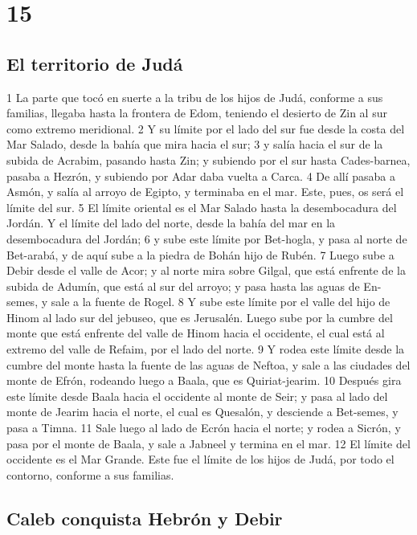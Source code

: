 \chapter{15}

\section*{El territorio de Judá}

1 La parte que tocó en suerte a la tribu de los hijos de Judá, conforme a sus familias, llegaba hasta la frontera de Edom, teniendo el desierto de Zin al sur como extremo meridional.
2 Y su límite por el lado del sur fue desde la costa del Mar Salado, desde la bahía que mira hacia el sur;
3 y salía hacia el sur de la subida de Acrabim, pasando hasta Zin; y subiendo por el sur hasta Cades-barnea, pasaba a Hezrón, y subiendo por Adar daba vuelta a Carca.
4 De allí pasaba a Asmón, y salía al arroyo de Egipto, y terminaba en el mar. Este, pues, os será el límite del sur.
5 El límite oriental es el Mar Salado hasta la desembocadura del Jordán. Y el límite del lado del norte, desde la bahía del mar en la desembocadura del Jordán;
6 y sube este límite por Bet-hogla, y pasa al norte de Bet-arabá, y de aquí sube a la piedra de Bohán hijo de Rubén.
7 Luego sube a Debir desde el valle de Acor; y al norte mira sobre Gilgal, que está enfrente de la subida de Adumín, que está al sur del arroyo; y pasa hasta las aguas de En-semes, y sale a la fuente de Rogel.
8 Y sube este límite por el valle del hijo de Hinom al lado sur del jebuseo, que es Jerusalén. Luego sube por la cumbre del monte que está enfrente del valle de Hinom hacia el occidente, el cual está al extremo del valle de Refaim, por el lado del norte.
9 Y rodea este límite desde la cumbre del monte hasta la fuente de las aguas de Neftoa, y sale a las ciudades del monte de Efrón, rodeando luego a Baala, que es Quiriat-jearim.
10 Después gira este límite desde Baala hacia el occidente al monte de Seir; y pasa al lado del monte de Jearim hacia el norte, el cual es Quesalón, y desciende a Bet-semes, y pasa a Timna.
11 Sale luego al lado de Ecrón hacia el norte; y rodea a Sicrón, y pasa por el monte de Baala, y sale a Jabneel y termina en el mar.
12 El límite del occidente es el Mar Grande. Este fue el límite de los hijos de Judá, por todo el contorno, conforme a sus familias.

\section*{Caleb conquista Hebrón y Debir}

